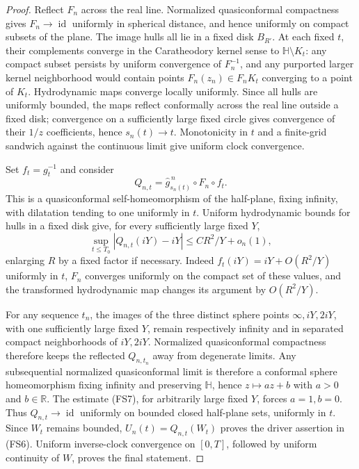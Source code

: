 \documentclass[11pt]{article}
\theoremstyle{definition}\newtheorem{definition}[theorem]{Definition}
\theoremstyle{remark}\newtheorem{remark}[theorem]{Remark}
\begin{document}
\begin{proof}
Reflect $F_n$ across the real line. Normalized quasiconformal
compactness gives $F_n\to\operatorname{id}$ uniformly in spherical
distance, and hence uniformly on compact subsets of the plane.
The image hulls all lie in a fixed disk $B_{R'}$. At each fixed $t$,
their complements converge in the Caratheodory kernel sense to
$\mathbb H\setminus K_t$: any compact subset persists by uniform
convergence of $F_n^{-1}$, and any purported larger kernel
neighborhood would contain points $F_n(z_n)\in F_nK_t$ converging
to a point of $K_t$. Hydrodynamic maps converge locally uniformly.
Since all hulls are uniformly bounded, the maps reflect conformally
across the real line outside a fixed disk; convergence on a sufficiently
large fixed circle gives convergence of their $1/z$ coefficients,
hence $s_n(t)\to t$. Monotonicity in $t$ and a finite-grid sandwich
against the continuous limit give uniform clock convergence.

Set $f_t=g_t^{-1}$ and consider
\[
 Q_{n,t}=\widehat g^{\,n}_{s_n(t)}\circ F_n\circ f_t.
\]
This is a quasiconformal self-homeomorphism of the half-plane,
fixing infinity, with dilatation tending to one uniformly in $t$.
Uniform hydrodynamic bounds for hulls in a fixed disk give, for
every sufficiently large fixed $Y$,
\[
 \sup_{t\le T_0}|Q_{n,t}(iY)-iY|
       \le CR^2/Y+o_n(1),
 \tag{FS7}
\]
enlarging $R$ by a fixed factor if necessary. Indeed
$f_t(iY)=iY+O(R^2/Y)$ uniformly in $t$, $F_n$ converges uniformly
on the compact set of these values, and the transformed
hydrodynamic map changes its argument by $O(R^2/Y)$.

For any sequence $t_n$, the images of the three distinct sphere
points $\infty,iY,2iY$, with one sufficiently large fixed $Y$,
remain respectively infinity and in separated compact neighborhoods
of $iY,2iY$. Normalized quasiconformal compactness therefore keeps
the reflected $Q_{n,t_n}$ away from degenerate limits. Any subsequential normalized
quasiconformal limit is therefore a conformal sphere
homeomorphism fixing infinity and preserving $\mathbb H$, hence
$z\mapsto az+b$ with $a>0$ and $b\in\mathbb R$. The estimate
(FS7), for arbitrarily large fixed $Y$, forces $a=1,b=0$.
Thus $Q_{n,t}\to\operatorname{id}$ uniformly on bounded closed
half-plane sets, uniformly in $t$. Since $W_t$ remains bounded,
$U_n(t)=Q_{n,t}(W_t)$ proves the driver assertion in (FS6).
Uniform inverse-clock convergence on $[0,T]$, followed by uniform
continuity of $W$, proves the final statement.
\end{proof}
\end{document}
